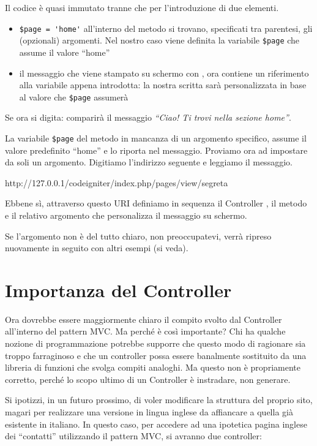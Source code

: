 Il codice è quasi immutato tranne che per l'introduzione di due elementi.

\begin{itemize}
\item \verb|$page = 'home'| all'interno del metodo  si trovano, specificati tra parentesi, gli (opzionali) argomenti. Nel nostro caso viene definita la variabile \verb|$page| che assume il valore ``home''
\item il messaggio che viene stampato su schermo con , ora contiene un riferimento alla variabile appena introdotta: la nostra scritta sarà personalizzata in base al valore che \verb|$page| assumerà
\end{itemize}

Se ora si digita:  comparirà il messaggio \textit{``Ciao! Ti trovi nella sezione home''}.

La variabile \verb|$page| del metodo  in mancanza di un argomento specifico, assume il valore predefinito ``home'' e lo riporta nel messaggio. Proviamo ora ad impostare da soli un argomento. Digitiamo l'indirizzo seguente e leggiamo il messaggio.

\begin{code}
http://127.0.0.1/codeigniter/index.php/pages/view/segreta
\end{code}

Ebbene sì, attraverso questo \ac{URI} definiamo in sequenza il Controller , il metodo  e il relativo argomento  che personalizza il messaggio su schermo.

Se l'argomento non è del tutto chiaro, non preoccupatevi, verrà ripreso nuovamente in seguito con altri esempi (si veda).

\label{sec:uri}
\section*{Importanza del Controller}
Ora dovrebbe essere maggiormente chiaro il compito svolto dal Controller all'interno del pattern \ac{MVC}. Ma perché è così importante? Chi ha qualche nozione di programmazione potrebbe supporre che questo modo di ragionare sia troppo farraginoso e che un controller possa essere banalmente sostituito da una libreria di funzioni che svolga compiti analoghi. Ma questo non è propriamente corretto, perché lo scopo ultimo di un Controller è instradare, non generare.

Si ipotizzi, in un futuro prossimo, di voler modificare la struttura del proprio sito, magari per realizzare una versione in lingua inglese da affiancare a quella già esistente in italiano. In questo caso, per accedere ad una ipotetica pagina inglese dei ``contatti'' utilizzando il pattern \ac{MVC}, si avranno due controller:

